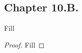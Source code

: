 \subsection*{Chapter 10.B. }


\begin{exercise}{1}
  Fill
\end{exercise}
\begin{proof}
 Fill
\end{proof}